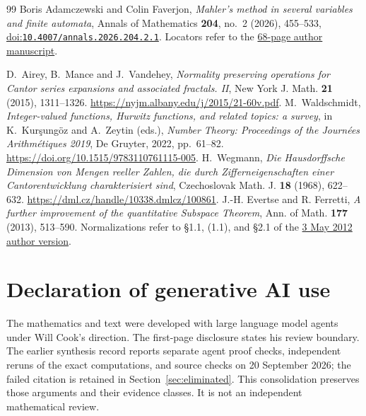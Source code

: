 \documentclass[11pt]{article}
\begin{document}
\begin{thebibliography}{99}
 Boris Adamczewski and Colin Faverjon,
  \emph{Mahler's method in several variables and finite automata},
  Annals of Mathematics \textbf{204}, no.~2 (2026), 455--533,
  \href{https://doi.org/10.4007/annals.2026.204.2.1}{doi:\nolinkurl{10.4007/annals.2026.204.2.1}}.
  Locators refer to the
  \href{https://faverjon.perso.math.cnrs.fr/AdamczewskiFaverjon_MahlerFiniteAutomata.pdf}{68-page author manuscript}.

 D.~Airey, B.~Mance and J.~Vandehey,
\emph{Normality preserving operations for Cantor series expansions and
associated fractals. II}, New York J. Math. \textbf{21} (2015), 1311--1326.
\url{https://nyjm.albany.edu/j/2015/21-60v.pdf}.
 M.~Waldschmidt,
\emph{Integer-valued functions, Hurwitz functions, and related topics: a survey},
in K.~Kur\c{s}ung\"oz and A.~Zeytin (eds.), \emph{Number Theory: Proceedings
of the Journ\'ees Arithm\'etiques 2019}, De Gruyter, 2022, pp.~61--82.
\url{https://doi.org/10.1515/9783110761115-005}.
 H.~Wegmann,
\emph{Die Hausdorffsche Dimension von Mengen reeller Zahlen, die durch
Zifferneigenschaften einer Cantorentwicklung charakterisiert sind},
Czechoslovak Math. J. \textbf{18} (1968), 622--632.
\url{https://dml.cz/handle/10338.dmlcz/100861}.
 J.-H. Evertse and R. Ferretti,
  \emph{A further improvement of the quantitative Subspace Theorem},
  Ann. of Math. \textbf{177} (2013), 513--590.
  Normalizations refer to \S1.1, (1.1), and \S2.1 of the
  \href{https://pub.math.leidenuniv.nl/~evertsejh/10-subspace.pdf}{3 May 2012 author version}.

\end{thebibliography}

\section*{Declaration of generative AI use}
The mathematics and text were developed with large language model agents
under Will Cook's direction. The first-page disclosure states his review
boundary. The earlier synthesis record reports separate agent proof checks,
independent reruns of the exact computations, and source checks on 20 September
2026; the failed citation is retained in Section~\ref{sec:eliminated}.
This consolidation preserves those arguments and their evidence classes.
It is not an independent mathematical review.
\end{document}
